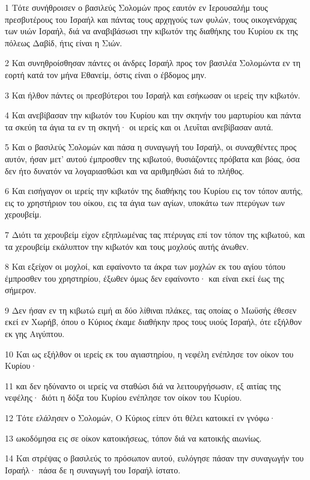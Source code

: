 \par 1 Τότε συνήθροισεν ο βασιλεύς Σολομών προς εαυτόν εν Ιερουσαλήμ τους πρεσβυτέρους του Ισραήλ και πάντας τους αρχηγούς των φυλών, τους οικογενάρχας των υιών Ισραήλ, διά να αναβιβάσωσι την κιβωτόν της διαθήκης του Κυρίου εκ της πόλεως Δαβίδ, ήτις είναι η Σιών.
\par 2 Και συνηθροίσθησαν πάντες οι άνδρες Ισραήλ προς τον βασιλέα Σολομώντα εν τη εορτή κατά τον μήνα Εθανείμ, όστις είναι ο έβδομος μην.
\par 3 Και ήλθον πάντες οι πρεσβύτεροι του Ισραήλ και εσήκωσαν οι ιερείς την κιβωτόν.
\par 4 Και ανεβίβασαν την κιβωτόν του Κυρίου και την σκηνήν του μαρτυρίου και πάντα τα σκεύη τα άγια τα εν τη σκηνή· οι ιερείς και οι Λευΐται ανεβίβασαν αυτά.
\par 5 Και ο βασιλεύς Σολομών και πάσα η συναγωγή του Ισραήλ, οι συναχθέντες προς αυτόν, ήσαν μετ' αυτού έμπροσθεν της κιβωτού, θυσιάζοντες πρόβατα και βόας, όσα δεν ήτο δυνατόν να λογαριασθώσι και να αριθμηθώσι διά το πλήθος.
\par 6 Και εισήγαγον οι ιερείς την κιβωτόν της διαθήκης του Κυρίου εις τον τόπον αυτής, εις το χρηστήριον του οίκου, εις τα άγια των αγίων, υποκάτω των πτερύγων των χερουβείμ.
\par 7 Διότι τα χερουβείμ είχον εξηπλωμένας τας πτέρυγας επί τον τόπον της κιβωτού, και τα χερουβείμ εκάλυπτον την κιβωτόν και τους μοχλούς αυτής άνωθεν.
\par 8 Και εξείχον οι μοχλοί, και εφαίνοντο τα άκρα των μοχλών εκ του αγίου τόπου έμπροσθεν του χρηστηρίου, έξωθεν όμως δεν εφαίνοντο· και είναι εκεί έως της σήμερον.
\par 9 Δεν ήσαν εν τη κιβωτώ ειμή αι δύο λίθιναι πλάκες, τας οποίας ο Μωϋσής έθεσεν εκεί εν Χωρήβ, όπου ο Κύριος έκαμε διαθήκην προς τους υιούς Ισραήλ, ότε εξήλθον εκ γης Αιγύπτου.
\par 10 Και ως εξήλθον οι ιερείς εκ του αγιαστηρίου, η νεφέλη ενέπλησε τον οίκον του Κυρίου·
\par 11 και δεν ηδύναντο οι ιερείς να σταθώσι διά να λειτουργήσωσιν, εξ αιτίας της νεφέλης· διότι η δόξα του Κυρίου ενέπλησε τον οίκον του Κυρίου.
\par 12 Τότε ελάλησεν ο Σολομών, Ο Κύριος είπεν ότι θέλει κατοικεί εν γνόφω·
\par 13 ωκοδόμησα εις σε οίκον κατοικήσεως, τόπον διά να κατοικής αιωνίως.
\par 14 Και στρέψας ο βασιλεύς το πρόσωπον αυτού, ευλόγησε πάσαν την συναγωγήν του Ισραήλ· πάσα δε η συναγωγή του Ισραήλ ίστατο.
